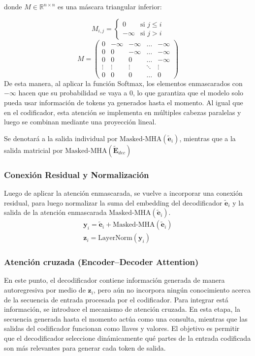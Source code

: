 \documentclass[12pt,letterpaper]{article}
\begin{document}
donde \( M \in \mathbb{R}^{n \times n} \) es una máscara triangular inferior:

\[
M_{i,j} =
\begin{cases}
0 & \text{si } j \le i \\
- \infty & \text{si } j > i
\end{cases}
\]
\[
M=
\begin{pmatrix}
0 & -\infty & -\infty& \dots & -\infty\\
0 & 0 & -\infty& \dots & -\infty\\
0& 0 & 0 & \dots &-\infty\\
\vdots &\vdots &\vdots & \ddots & \vdots\\
0 & 0 & 0 & \dots& 0
\end{pmatrix}
\]
De esta manera, al aplicar la función Softmax, los elementos enmascarados con $-\infty$ hacen que su probabilidad se vaya a 0, lo que garantiza que el modelo solo pueda usar información de tokens ya generados hasta el momento. Al igual que en el codificador, esta atención se implementa en múltiples cabezas paralelas y luego se combinan mediante una proyección lineal. 

Se denotará a la salida individual por $\text{Masked-MHA}(\tilde{\textbf{e}}_i)$, mientras que a la salida matricial por $\text{Masked-MHA}(\tilde{\textbf{E}}_{dec})$

\subsubsection{Conexión Residual y Normalización}
Luego de aplicar la atención enmascarada, se vuelve a incorporar una conexión residual, para luego normalizar la suma del embedding del decodificador $\tilde{\textbf{e}}_i$ y la salida de la atención enmascarada $\text{Masked-MHA}(\tilde{\textbf{e}}_i)$.
\begin{gather}
    \textbf{y}_i= \tilde{\textbf{e}}_i + \text{Masked-MHA}(\tilde{\textbf{e}}_i)\\
    \textbf{z}_i = \text{LayerNorm}(\textbf{y}_i)
\end{gather}

\subsubsection{Atención cruzada (Encoder–Decoder Attention)}
En este punto, el decodificador contiene información generada de manera autoregresiva por medio de $\textbf{z}_i$, pero aún no incorpora ningún conocimiento acerca de la secuencia de entrada procesada por el codificador. Para integrar está información, se introduce el mecanismo de atención cruzada. En esta etapa, la secuencia generada hasta el momento actúa como una consulta, mientras que las salidas del codificador funcionan como llaves y valores. El objetivo es permitir que el decodificador seleccione dinámicamente qué partes de la entrada codificada son más relevantes para generar cada token de salida.
\end{document}
